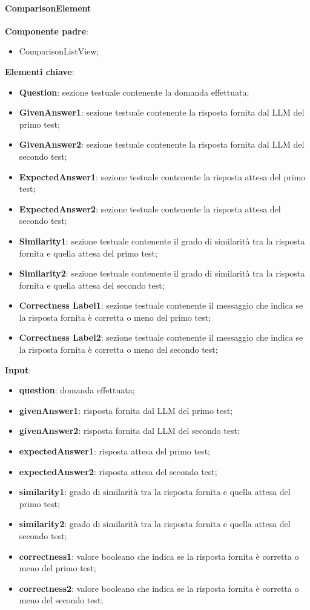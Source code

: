 \paragraph{ComparisonElement}
\textbf{Componente padre}:
\begin{itemize}
    \item ComparisonListView;
\end{itemize}
\textbf{Elementi chiave}:
\begin{itemize}
    \item \textbf{Question}: sezione testuale contenente la domanda effettuata;
    \item \textbf{GivenAnswer1}: sezione testuale contenente la risposta fornita dal LLM del primo test;
    \item \textbf{GivenAnswer2}: sezione testuale contenente la risposta fornita dal LLM del secondo test;
    \item \textbf{ExpectedAnswer1}: sezione testuale contenente la risposta attesa del primo test;
    \item \textbf{ExpectedAnswer2}: sezione testuale contenente la risposta attesa del secondo test;
    \item \textbf{Similarity1}: sezione testuale contenente il grado di similarità tra la risposta fornita e quella attesa del primo test;
    \item \textbf{Similarity2}: sezione testuale contenente il grado di similarità tra la risposta fornita e quella attesa del secondo test;
    \item \textbf{Correctness Label1}: sezione testuale contenente il messaggio che indica se la risposta fornita è corretta o meno del primo test;
    \item \textbf{Correctness Label2}: sezione testuale contenente il messaggio che indica se la risposta fornita è corretta o meno del secondo test;
\end{itemize}
\textbf{Input}:
\begin{itemize}
    \item \textbf{question}: domanda effettuata;
    \item \textbf{givenAnswer1}: risposta fornita dal LLM del primo test;
    \item \textbf{givenAnswer2}: risposta fornita dal LLM del secondo test;
    \item \textbf{expectedAnswer1}: risposta attesa del primo test;
    \item \textbf{expectedAnswer2}: risposta attesa del secondo test;
    \item \textbf{similarity1}: grado di similarità tra la risposta fornita e quella attesa del primo test;
    \item \textbf{similarity2}: grado di similarità tra la risposta fornita e quella attesa del secondo test;
    \item \textbf{correctness1}: valore booleano che indica se la risposta fornita è corretta o meno del primo test;
    \item \textbf{correctness2}: valore booleano che indica se la risposta fornita è corretta o meno del secondo test;
\end{itemize}
